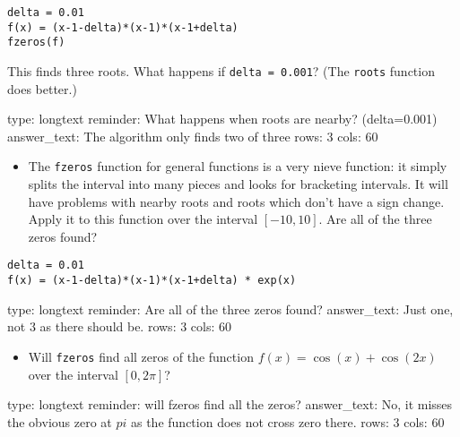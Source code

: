 \documentclass[12pt]{article}
\begin{document}
\begin{verbatim}
delta = 0.01
f(x) = (x-1-delta)*(x-1)*(x-1+delta)
fzeros(f)
\end{verbatim}
This finds three roots. What happens if \texttt{delta = 0.001}? (The
\texttt{roots} function does better.)

\begin{answer}
type: longtext
reminder: What happens when roots are nearby? (delta=0.001)
answer_text: The algorithm only finds two of three 
rows: 3
cols: 60
\end{answer}

\begin{itemize}
\itemsep1pt\parskip0pt
\item
  The \texttt{fzeros} function for general functions is a very nieve
  function: it simply splits the interval into many pieces and looks for
  bracketing intervals. It will have problems with nearby roots and
  roots which don't have a sign change. Apply it to this function over
  the interval $[-10,10]$. Are all of the three zeros found?
\end{itemize}



\begin{verbatim}
delta = 0.01
f(x) = (x-1-delta)*(x-1)*(x-1+delta) * exp(x)
\end{verbatim}
\begin{answer}
type: longtext
reminder: Are all of the three zeros found?
answer_text: Just one, not 3 as there should be. 
rows: 3
cols: 60
\end{answer}

\begin{itemize}
\itemsep1pt\parskip0pt
\item
  Will \texttt{fzeros} find all zeros of the function
  $f(x) = \cos(x) + \cos(2x)$ over the interval $[0,2\pi]$?
\end{itemize}

\begin{answer}
type: longtext
reminder: will fzeros find all the zeros?
answer_text: No, it misses the obvious zero at \( pi \) as the function does not cross zero there. 
rows: 3
cols: 60
\end{answer}
\end{document}
